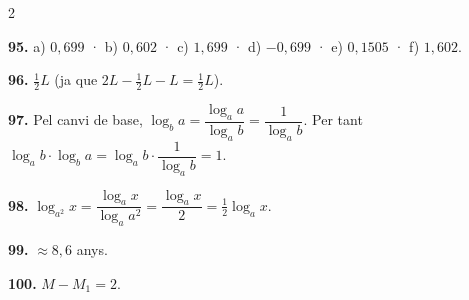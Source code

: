 \documentclass[13pt,a4paper]{extarticle}
\begin{document}
\begin{multicols}{2}
\begin{minipage}{\linewidth}
\end{minipage}\par\vspace{1.6mm}
\par\noindent\begin{minipage}{\linewidth}
\textbf{95.} a) $0{,}699$ · b) $0{,}602$ · c) $1{,}699$ · d) $-0{,}699$ · e) $0{,}1505$ · f) $1{,}602$.\par
\end{minipage}\par\vspace{1.6mm}
\par\noindent\begin{minipage}{\linewidth}
\textbf{96.} $\tfrac12 L$ (ja que $2L-\tfrac12L-L=\tfrac12L$).\par
\end{minipage}\par\vspace{1.6mm}
\par\noindent\begin{minipage}{\linewidth}
\textbf{97.} Pel canvi de base, $\log_b a=\dfrac{\log_a a}{\log_a b}=\dfrac{1}{\log_a b}$. Per tant $\log_a b\cdot\log_b a=\log_a b\cdot\dfrac{1}{\log_a b}=1$.\par
\end{minipage}\par\vspace{1.6mm}
\par\noindent\begin{minipage}{\linewidth}
\textbf{98.} $\log_{a^2}x=\dfrac{\log_a x}{\log_a a^2}=\dfrac{\log_a x}{2}=\tfrac12\log_a x$.\par
\end{minipage}\par\vspace{1.6mm}
\par\noindent\begin{minipage}{\linewidth}
\textbf{99.} $\approx8{,}6$ anys.\par
\end{minipage}\par\vspace{1.6mm}
\par\noindent\begin{minipage}{\linewidth}
\textbf{100.} $M-M_1=2$.\par


\end{minipage}
\end{multicols}
\end{document}
